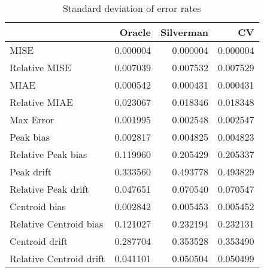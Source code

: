 \begin{table}[H]
\centering
\begin{tabular}{lrrr}
  \hline
 & Oracle & Silverman & CV \\ 
  \hline
MISE & 0.000004 & 0.000004 & 0.000004 \\ 
  Relative MISE & 0.007039 & 0.007532 & 0.007529 \\ 
  MIAE & 0.000542 & 0.000431 & 0.000431 \\ 
  Relative MIAE & 0.023067 & 0.018346 & 0.018348 \\ 
  Max Error & 0.001995 & 0.002548 & 0.002547 \\ 
  Peak bias & 0.002817 & 0.004825 & 0.004823 \\ 
  Relative Peak bias & 0.119960 & 0.205429 & 0.205337 \\ 
  Peak drift & 0.333560 & 0.493778 & 0.493829 \\ 
  Relative Peak drift & 0.047651 & 0.070540 & 0.070547 \\ 
  Centroid bias & 0.002842 & 0.005453 & 0.005452 \\ 
  Relative Centroid bias & 0.121027 & 0.232194 & 0.232131 \\ 
  Centroid drift & 0.287704 & 0.353528 & 0.353490 \\ 
  Relative Centroid drift & 0.041101 & 0.050504 & 0.050499 \\ 
   \hline
\end{tabular}
\caption{Standard deviation of error rates} 
\label{tbl:stddev_error_rates}
\end{table}

